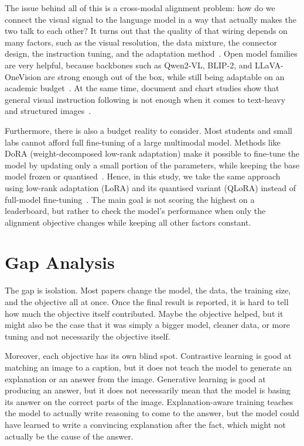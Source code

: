\documentclass[12pt,bibliography=totoc,listof=totoc,BCOR=5mm,DIV=12,oneside,open=any]{scrbook}
\let\cite\citep
\begin{document}
The issue behind all of this is a cross-modal alignment problem: how do we connect the visual signal to the language model in a way that actually makes the two talk to each other?
It turns out that the quality of that wiring depends on many factors, such as the visual resolution, the data mixture, the connector design, the instruction tuning, and the adaptation method~\cite{laurencon2024whatmatters,zhang2025mm15,deitke2025molmo}.
Open model families are very helpful, because backbones such as Qwen2-VL, BLIP-2, and LLaVA-OneVision are strong enough out of the box, while still being adaptable on an academic budget~\cite{wang2024qwen2vl,li2023blip2,li2025llavaonevision}.
At the same time, document and chart studies show that general visual instruction following is not enough when it comes to text-heavy and structured images~\cite{fu2025textrichsurvey,wang2024docllm,masry2024chartinstruct,masry2025chartgemma}.

Furthermore, there is also a budget reality to consider.
Most students and small labs cannot afford full fine-tuning of a large multimodal model.
Methods like DoRA (weight-decomposed low-rank adaptation) make it possible to fine-tune the model by updating only a small portion of the parameters, while keeping the base model frozen or quantised~\cite{liu2024dora}.
Hence, in this study, we take the same approach using low-rank adaptation (LoRA) and its quantised variant (QLoRA) instead of full-model fine-tuning~\cite{hu2022lora,dettmers2023qlora}.
The main goal is not scoring the highest on a leaderboard, but rather to check the model's performance when only the alignment objective changes while keeping all other factors constant.

\section{Gap Analysis}
The gap is isolation.
Most papers change the model, the data, the training size, and the objective all at once.
Once the final result is reported, it is hard to tell how much the objective itself contributed.
Maybe the objective helped, but it might also be the case that it was simply a bigger model, cleaner data, or more tuning and not necessarily the objective itself.

Moreover, each objective has its own blind spot.
Contrastive learning is good at matching an image to a caption, but it does not teach the model to generate an explanation or an answer from the image.
Generative learning is good at producing an answer, but it does not necessarily mean that the model is basing its answer on the correct parts of the image.
Explanation-aware training teaches the model to actually write reasoning to come to the answer, but the model could have learned to write a convincing explanation after the fact,
which might not actually be the cause of the answer.
\end{document}
